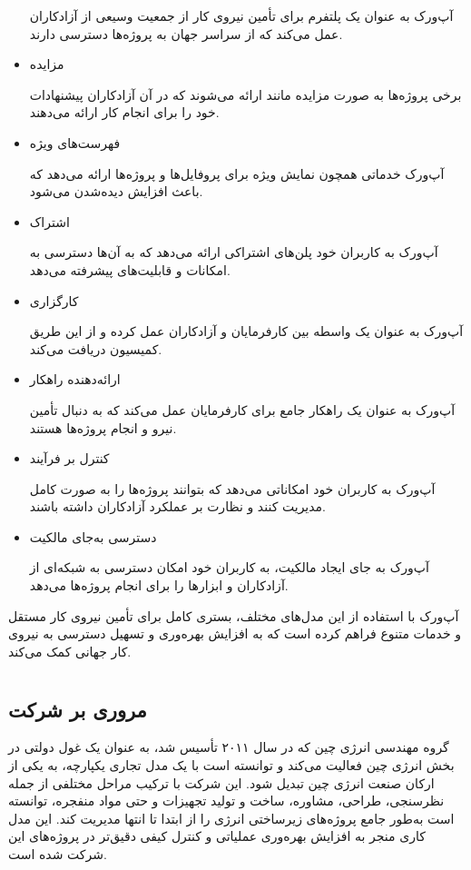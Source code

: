 \documentclass[dvipsnames, svgnames, x11names, 11pt, twocolumn]{article}
\begin{document}
\begin{itemize}
آپ‌ورک به عنوان یک پلتفرم برای تأمین نیروی کار از جمعیت وسیعی از آزادکاران عمل می‌کند که از سراسر جهان به پروژه‌ها دسترسی دارند.

\item
مزایده

برخی پروژه‌ها به صورت مزایده‌ مانند ارائه می‌شوند که در آن آزادکاران پیشنهادات خود را برای انجام کار ارائه می‌دهند.

\item
فهرست‌های ویژه

آپ‌ورک خدماتی همچون نمایش ویژه برای پروفایل‌ها و پروژه‌ها ارائه می‌دهد که باعث افزایش دیده‌شدن می‌شود.

\item
اشتراک

آپ‌ورک به کاربران خود پلن‌های اشتراکی ارائه می‌دهد که به آن‌ها دسترسی به امکانات و قابلیت‌های پیشرفته می‌دهد.

\item
کارگزاری

آپ‌ورک به عنوان یک واسطه بین کارفرمایان و آزادکاران عمل کرده و از این طریق کمیسیون دریافت می‌کند.

\item
ارائه‌دهنده راهکار

آپ‌ورک به عنوان یک راهکار جامع برای کارفرمایان عمل می‌کند که به دنبال تأمین نیرو و انجام پروژه‌ها هستند.

\item
کنترل بر فرآیند 

آپ‌ورک به کاربران خود امکاناتی می‌دهد که بتوانند پروژه‌ها را به صورت کامل مدیریت کنند و نظارت بر عملکرد آزادکاران داشته باشند.

\item
دسترسی به‌جای مالکیت 

آپ‌ورک به جای ایجاد مالکیت، به کاربران خود امکان دسترسی به شبکه‌ای از آزادکاران و ابزارها را برای انجام پروژه‌ها می‌دهد.

\end{itemize}
آپ‌ورک با استفاده از این مدل‌های مختلف، بستری کامل برای تأمین نیروی کار مستقل و خدمات متنوع فراهم کرده است که به افزایش بهره‌وری و تسهیل دسترسی به نیروی کار جهانی کمک می‌کند.

\section{}
\subsection{مروری بر شرکت}
گروه مهندسی انرژی چین  که در سال ۲۰۱۱ تأسیس شد، به عنوان یک غول دولتی در بخش انرژی چین فعالیت می‌کند و توانسته است با یک مدل تجاری یکپارچه، به یکی از ارکان صنعت انرژی چین تبدیل شود. این شرکت با ترکیب مراحل مختلفی از جمله نظرسنجی، طراحی، مشاوره، ساخت و تولید تجهیزات و حتی مواد منفجره، توانسته است به‌طور جامع پروژه‌های زیرساختی انرژی را از ابتدا تا انتها مدیریت کند. این مدل کاری منجر به افزایش بهره‌وری عملیاتی و کنترل کیفی دقیق‌تر در پروژه‌های این شرکت شده است.
\end{document}
